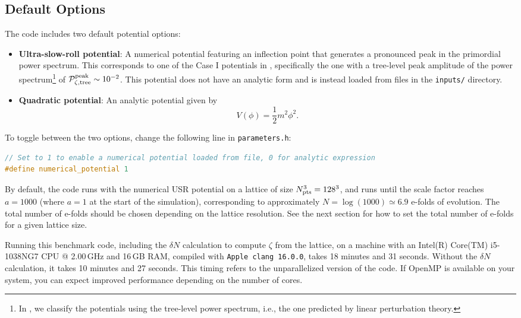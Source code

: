 \documentclass[aps, nofootinbib,superscriptaddress, preprintnumbers, longbibliography]{article}
\begin{document}
\subsection{Default Options}
\label{sec:default}

The code includes two default potential options:

\begin{itemize}
    \item \textbf{Ultra-slow-roll potential}: A numerical potential featuring an inflection point that generates a pronounced peak in the primordial power spectrum. This corresponds to one of the Case I potentials in \cite{Caravano:2024moy, USR2}, specifically the one with a tree-level peak amplitude of the power spectrum\footnote{In \cite{Caravano:2024moy,USR2}, we classify the potentials using the tree-level power spectrum, i.e., the one predicted by linear perturbation theory.} of $\mathcal{P}_{\zeta,\rm tree}^{\rm peak} \sim 10^{-2}$. This potential does not have an analytic form and is instead loaded from files in the \texttt{inputs/} directory.

    \item \textbf{Quadratic potential}: An analytic potential given by \begin{equation}
    V(\phi) = \frac{1}{2}m^2\phi^2.
    \end{equation}
\end{itemize}
To toggle between the two options, change the following line in \texttt{parameters.h}:

\begin{lstlisting}[language=C++, firstnumber=3,caption={}]
// Set to 1 to enable a numerical potential loaded from file, 0 for analytic expression
#define numerical_potential 1
\end{lstlisting}
By default, the code runs with the numerical USR potential on a lattice of size $N_{\rm pts}^3 = 128^3$, and runs until the scale factor reaches $a=1000$ (where $a=1$ at the start of the simulation), corresponding to approximately $N = \log(1000) \simeq 6.9$ e-folds of evolution. The total number of e-folds should be chosen depending on the lattice resolution. See the next section for how to set the total number of e-folds for a given lattice size.

Running this benchmark code, including the $\delta N$ calculation to compute $\zeta$ from the lattice, on a machine with an Intel(R) Core(TM) i5-1038NG7 CPU @ 2.00\,GHz and 16\,GB RAM, compiled with \texttt{Apple clang 16.0.0}, takes 18 minutes and 31 seconds. Without the $\delta N$ calculation, it takes 10 minutes and 27 seconds. This timing refers to the unparallelized version of the code. If OpenMP is available on your system, you can expect improved performance depending on the number of cores.
\end{document}
